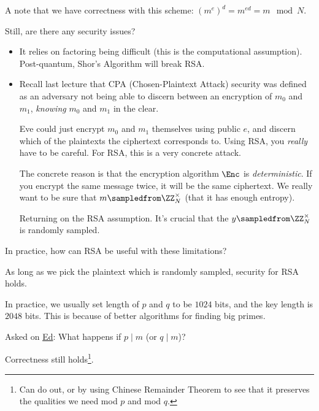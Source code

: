 A note that we have correctness with this scheme: $(m^e)^d= m^{ed} = m\mod N$.

\begin{ques*}
    Still, are there any security issues?
\end{ques*}
\begin{itemize}
    \item It relies on factoring being difficult (this is the computational assumption). Post-quantum, Shor's Algorithm will break RSA.
    \item Recall last lecture that CPA (Chosen-Plaintext Attack) security was defined as an adversary not being able to discern between an encryption of $m_0$ and $m_1$, \emph{knowing} $m_0$ and $m_1$ in the clear.

          Eve could just encrypt $m_0$ and $m_1$ themselves using public $e$, and discern which of the plaintexts the ciphertext corresponds to. Using RSA, you \emph{really} have to be careful. For RSA, this is a very concrete attack.

          The concrete reason is that the encryption algorithm $\Enc$ is \emph{deterministic}. If you encrypt the same message twice, it will be the same ciphertext. We really want to be sure that $m\sampledfrom \ZZ_N^\times$ (that it has enough entropy).

          Returning on the RSA assumption. It's crucial that the $y\sampledfrom \ZZ_N^\times$ is randomly sampled.
\end{itemize}

\begin{ques*}
    In practice, how can RSA be useful with these limitations?
\end{ques*}

As long as we pick the plaintext which is randomly sampled, security for RSA holds.

\begin{remark*}
    In practice, we usually set length of $p$ and $q$ to be $1024$ bits, and the key length is $2048$ bits. This is because of better algorithms for finding big primes.
\end{remark*}

\begin{ques*}
    Asked on \href{https://edstem.org/us/courses/33693/discussion/2483699}{Ed}: What happens if $p\mid m$ (or $q\mid m$)?
\end{ques*}

Correctness still holds\footnote{Can do out, or by using Chinese Remainder Theorem to see that it preserves the qualities we need mod $p$ and mod $q$. }.

